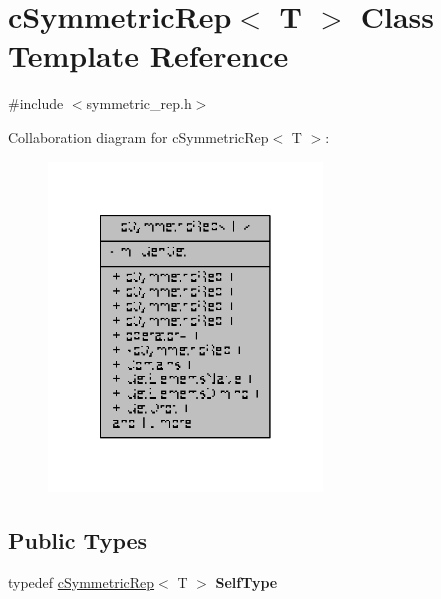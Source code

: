 \hypertarget{classcSymmetricRep}{\section{c\-Symmetric\-Rep$<$ T $>$ Class Template Reference}
\label{classcSymmetricRep}
}


{\ttfamily \#include $<$symmetric\-\_\-rep.\-h$>$}



Collaboration diagram for c\-Symmetric\-Rep$<$ T $>$\-:
\nopagebreak
\begin{figure}[H]
\begin{center}
\leavevmode
\includegraphics[width=206pt]{classcSymmetricRep__coll__graph}
\end{center}
\end{figure}
\subsection*{Public Types}
\begin{DoxyCompactItemize}
\item 
\hypertarget{classcSymmetricRep_abb21d3323b4e2133ec7bbc4f2d45d968}{typedef \hyperlink{classcSymmetricRep}{c\-Symmetric\-Rep}$<$ T $>$ {\bfseries Self\-Type}}\label{classcSymmetricRep_abb21d3323b4e2133ec7bbc4f2d45d968}

\end{DoxyCompactItemize}
